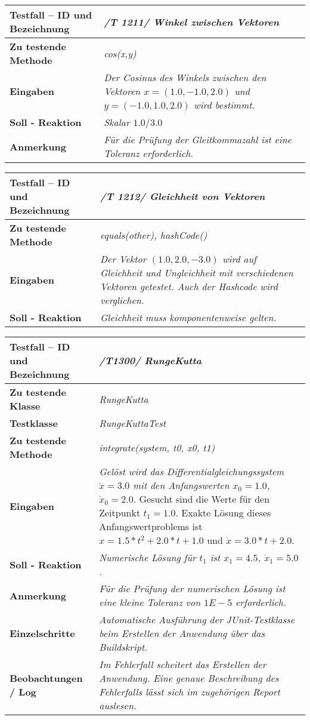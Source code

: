 \begin{longtable}{|p{7cm}|p{10cm}|}
\hline
\textbf{Testfall -- ID und Bezeichnung} & \textit{ /T 1211/ Winkel zwischen Vektoren} \\
\hline
\textbf{Zu testende Methode} &  \textit{cos(x,y)} \\
\hline
\textbf{Eingaben} & \textit{Der Cosinus des Winkels zwischen den Vektoren 
$x=(1.0, -1.0, 2.0)$ und $y=(-1.0, 1.0, 2.0)$ wird bestimmt.}\\
\hline
\textbf{Soll - Reaktion} & \textit{Skalar $1.0/3.0$} \\
\hline
\textbf{Anmerkung} & \textit{Für die Prüfung der Gleitkommazahl ist eine 
Toleranz erforderlich.} \\
\hline
\end{longtable}
\begin{longtable}{|p{7cm}|p{10cm}|}
\hline
\textbf{Testfall -- ID und Bezeichnung} & \textit{ /T 1212/ Gleichheit von Vektoren} \\
\hline
\textbf{Zu testende Methode} &  \textit{equals(other), hashCode()} \\
\hline
\textbf{Eingaben} & \textit{Der Vektor $(1.0, 2.0, -3.0)$ wird auf Gleichheit und
Ungleichheit mit verschiedenen Vektoren getestet. Auch der Hashcode wird verglichen.}\\
\hline
\textbf{Soll - Reaktion} & \textit{Gleichheit muss komponentenweise gelten.} \\
\hline
\end{longtable}

\begin{longtable}{|p{7cm}|p{10cm}|}
\hline
\textbf{Testfall -- ID und Bezeichnung} &  \textit{/T1300/ RungeKutta} \\
\hline
\textbf{Zu testende Klasse} &  \textit{RungeKutta} \\
\hline
\textbf{Testklasse} &  \textit{RungeKuttaTest} \\
\hline
\textbf{Zu testende Methode} &  \textit{integrate(system, t0, x0, t1)}\\
\hline
\textbf{Eingaben} & \textit{Gelöst wird das Differentialgleichungssystem $\ddot{x} = 3.0$ mit
den Anfangswerten $x_0 = 1.0$, $\dot{x}_0 = 2.0$}. Gesucht sind die Werte für den Zeitpunkt
$t_1 = 1.0$. Exakte Lösung dieses Anfangswertproblems ist $x = 1.5 * t^2 + 2.0 * t + 1.0$ und $\dot{x} = 3.0 * t + 2.0$. \\
\hline
\textbf{Soll - Reaktion} & \textit{Numerische Lösung für $t_1$ ist $x_1 = 4.5$, $\dot{x}_1 = 5.0$}. \\
\hline
\textbf{Anmerkung} & \textit{Für die Prüfung der numerischen Lösung ist eine kleine 
Toleranz von $1E-5$ erforderlich.} \\
\hline
\textbf{Einzelschritte} &  \textit{Automatische Ausführung der JUnit-Testklasse beim Erstellen
der Anwendung über das Buildskript.} \\
\hline
\textbf{Beobachtungen / Log} &  \textit{Im Fehlerfall scheitert das Erstellen der Anwendung.
Eine genaue Beschreibung des Fehlerfalls lässt sich im zugehörigen Report auslesen.} \\
\hline
\end{longtable}

